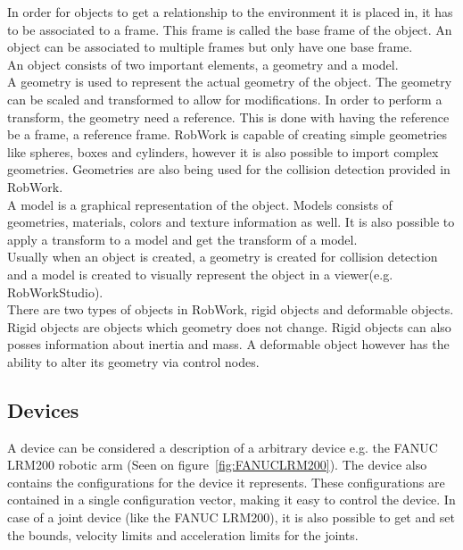 In order for objects to get a relationship to the environment it is placed in, it has to be associated to a frame. This frame is called the base frame of the object. An object can be associated to multiple frames but only have one base frame.\\

An object consists of two important elements, a geometry and a model.\\
A geometry is used to represent the actual geometry of the object. The geometry can be scaled and transformed to allow for modifications. In order to perform a transform, the geometry need a reference. This is done with having the reference be a frame, a reference frame. RobWork is capable of creating simple geometries like spheres, boxes and cylinders, however it is also possible to import complex geometries. Geometries are also being used for the collision detection provided in RobWork.\\
A model is a graphical representation of the object. Models consists of geometries, materials, colors and texture information as well. It is also possible to apply a transform to a model and get the transform of a model.\\
Usually when an object is created, a geometry is created for collision detection and a model is created to visually represent the object in a viewer(e.g. RobWorkStudio).\\

There are two types of objects in RobWork, rigid objects and deformable objects. Rigid objects are objects which  geometry does not change. Rigid objects can also posses information about inertia and mass. A deformable object however has the ability to alter its geometry via control nodes.


\subsection{Devices}
A device can be considered a description of a arbitrary device e.g. the FANUC LRM200 robotic arm (Seen on figure~\ref{fig:FANUCLRM200}). The device also contains the configurations for the device it represents. These configurations are contained in a single configuration vector, making it easy to control the device. In case of a joint device (like the FANUC LRM200), it is also possible to get and set the bounds, velocity limits and acceleration limits for the joints.\\

